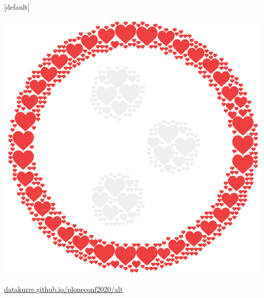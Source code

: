 \documentclass[12pt,aspectratio=169]{beamer}
\begin{document}
[default]
\begin{frame}[standout]
\vfill
\includegraphics[height=0.50\paperheight]{images/plone-icon-hearts.png}
\par
\href{https://datakurre.github.io/ploneconf2020/}{datakurre.github.io/ploneconf2020/alt}
\end{frame}

\end{document}

